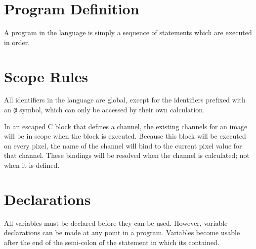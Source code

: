 \section{Program Definition}
A program in the \sys{} language is simply a sequence of statements which
are executed in order.

\section{Scope Rules}
All identifiers in the \sys{} language are global, except for the
identifiers prefixed with an \texttt{@} symbol, which can only be
accessed by their own calculation.

In an escaped C block that defines a channel, the existing channels
for an image will be in scope when the block is executed. Because
this block will be executed on every pixel, the name of the channel
will bind to the current pixel value for that channel. These bindings
will be resolved when the channel is calculated; not when it is
defined.

\section{Declarations}
All variables must be declared before they can be used. However,
variable declarations can be made at any point in a program.
Variables become usable after the end of the semi-colon of the statement
in which its contained.

